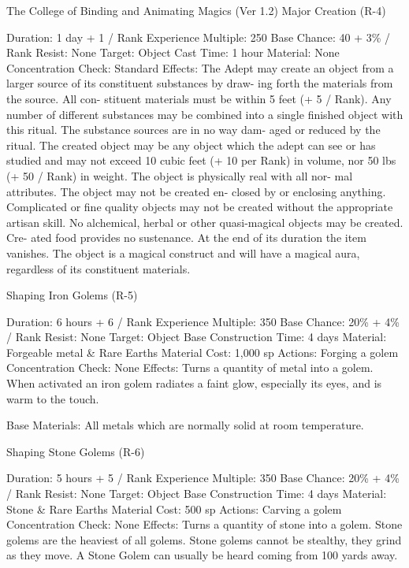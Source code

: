 \begin{Chapter}{The College of Binding and Animating Magics (Ver 1.2)}
Major Creation (R-4) 

Duration: 1 day + 1 / Rank 
Experience Multiple: 250 
Base Chance: 40 + 3\% / Rank 
Resist: None 
Target: Object 
Cast Time: 1 hour 
Material: None 
Concentration Check: Standard 
Effects:  The  Adept  may  create  an  object  from  a 
larger source of its constituent substances by draw-
ing  forth  the  materials  from  the  source.  All  con-
stituent  materials  must  be  within  5  feet  (+  5  / 
Rank). Any number of different substances may be 
combined  into  a  single  finished  object  with  this 
ritual.  The  substance  sources  are  in  no  way  dam-
aged  or  reduced  by  the  ritual.  The  created  object 
may  be  any  object  which  the  adept can  see  or  has 
studied and may not exceed 10 cubic feet (+ 10 per 
Rank)  in  volume,  nor  50  lbs  (+  50  /  Rank)  in 
weight.  The  object  is  physically  real  with  all  nor-
mal  attributes.  The  object  may  not  be  created  en-
closed  by  or  enclosing  anything.  Complicated  or 
fine quality objects may not be created without the 
appropriate  artisan  skill.  No  alchemical,  herbal  or 
other  quasi-magical  objects  may  be  created.  Cre-
ated food provides no sustenance. At the end of its 
duration the item vanishes. The object is a magical 
construct  and  will  have  a  magical  aura,  regardless 
of its constituent materials. 

Shaping Iron Golems (R-5) 

Duration: 6 hours + 6 / Rank 
Experience Multiple: 350 
Base Chance: 20\% + 4\% / Rank 
Resist: None 
Target: Object 
Base Construction Time: 4 days 
Material: Forgeable metal \& Rare Earths 
Material Cost: 1,000 sp 
Actions: Forging a golem 
Concentration Check: None 
Effects:  Turns  a  quantity  of  metal  into  a  golem. 
When  activated  an  iron  golem  radiates  a  faint 
glow, especially its eyes, and is warm to the touch. 

Base  Materials:  All  metals  which  are  normally 
solid at room temperature. 

Shaping Stone Golems (R-6) 

Duration: 5 hours + 5 / Rank 
Experience Multiple: 350 
Base Chance: 20\% + 4\% / Rank 
Resist: None 
Target: Object 
Base Construction Time: 4 days 
Material: Stone \& Rare Earths Material Cost: 500 
sp 
Actions: Carving a golem 
Concentration Check: None 
Effects:  Turns  a  quantity  of  stone  into  a  golem. 
Stone golems are the heaviest of all golems. Stone 
golems  cannot  be  stealthy,  they  grind  as  they 
move. A Stone Golem can usually be heard coming 
from 100 yards away. 


\end{Chapter}
